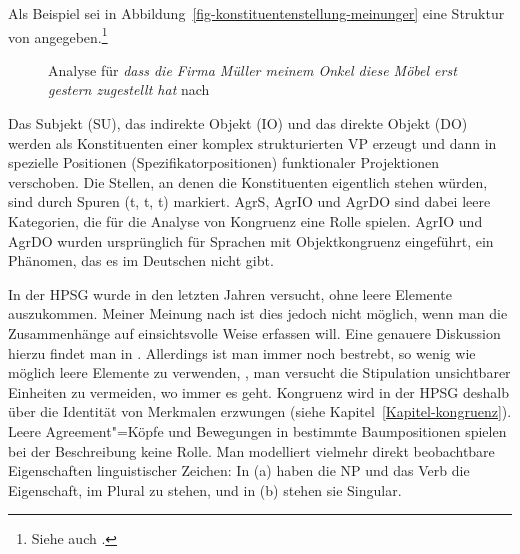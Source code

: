 \begin{exe}
\begin{xlist}

%
Als Beispiel sei in Abbildung~\vref{fig-konstituentenstellung-meinunger} eine Struktur von \citet{Meinunger2000a} angegeben.\footnote{
  Siehe auch .%
}

\begin{figure}
\caption{\label{fig-konstituentenstellung-meinunger}Analyse für \emph{dass die Firma Müller meinem Onkel diese Möbel erst gestern zugestellt hat} 
nach }
\end{figure}
Das Subjekt (SU), das indirekte Objekt (IO) und das direkte Objekt (DO) werden als Konstituenten
einer komplex strukturierten VP erzeugt und dann in spezielle Positionen (Spezifikatorpositionen)
funktionaler Projektionen verschoben. Die Stellen, an denen die Konstituenten eigentlich stehen würden,
sind durch Spuren (t, t, t) markiert. AgrS, AgrIO und AgrDO sind dabei leere
Kategorien, die für die Analyse von Kongruenz eine Rolle spielen. AgrIO und
AgrDO wurden ursprünglich für Sprachen mit Objektkongruenz eingeführt, ein
Phänomen, das es im Deutschen nicht gibt.


In der HPSG wurde in den letzten Jahren versucht, ohne leere Elemente auszukommen. Meiner Meinung
nach ist dies jedoch nicht möglich, wenn man die Zusammenhänge auf einsichtsvolle Weise erfassen
will. Eine genauere Diskussion hierzu findet man in . Allerdings ist man immer
noch bestrebt, so wenig wie möglich leere Elemente zu verwenden, \dash, man versucht die Stipulation
unsichtbarer Einheiten zu vermeiden, wo immer es geht.
Kongruenz wird in der HPSG deshalb über die Identität von Merkmalen erzwungen (siehe
Kapitel~\ref{Kapitel-kongruenz}). Leere Agreement"=Köpfe und Bewegungen in bestimmte Baumpositionen
spielen bei der Beschreibung keine Rolle.  Man modelliert vielmehr direkt beobachtbare Eigenschaften
linguistischer Zeichen: In (a) haben die NP und das Verb die Eigenschaft, im Plural zu stehen, und
in (b) stehen sie Singular.


\end{xlist}
\end{exe}
